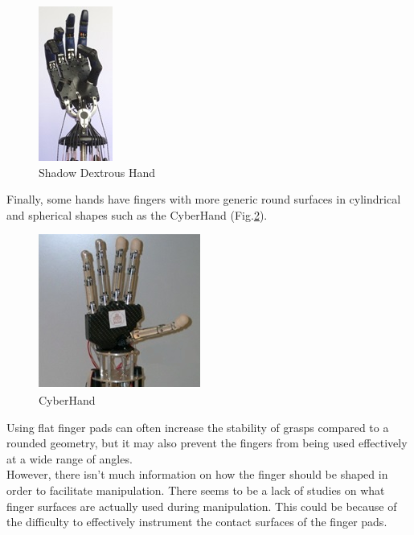 \documentclass[a4paper, 10pt, conference]{ieeeconf}      %
\begin{document}
\begin{figure}[h!]
\centering  \includegraphics[scale=0.8]{./images/ShadowDextrousHand}
  \caption{Shadow Dextrous Hand}
  \label{fig:ShadowDextrousHand}
	\end{figure}
Finally, some hands have fingers with more generic round surfaces in cylindrical and spherical shapes such as the CyberHand (Fig.\ref{fig:CyberHand}).\\
\begin{figure}[h!]
\centering  \includegraphics[scale=0.7]{./images/CyberHand}
  \caption{CyberHand}
  \label{fig:CyberHand}
	\end{figure}
Using flat finger pads can often increase the stability of grasps compared to a rounded geometry, but it may also prevent the fingers from being used effectively at a wide range of angles.\\
However, there isn't much information on how the finger should be shaped in order to facilitate manipulation. There seems to be a lack of studies on what finger surfaces are actually used during manipulation. This could be because of the difficulty to effectively instrument the contact surfaces of the finger pads.\\
\end{document}
